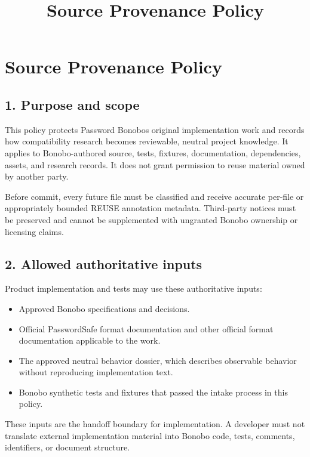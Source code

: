 \documentclass[
  letterpaper,
]{article}
\title{Source Provenance Policy}
\author{}
\date{}
\providecommand{\tightlist}{%
  \setlength{\itemsep}{0pt}\setlength{\parskip}{0pt}}
\begin{document}
\maketitle

{
\setcounter{tocdepth}{3}
\tableofcontents
}
\section{Source Provenance Policy}\label{source-provenance-policy}

\subsection{1. Purpose and scope}\label{1-purpose-and-scope}

This policy protects Password Bonobo\textquotesingle s original implementation work and records how compatibility
research becomes reviewable, neutral project knowledge. It applies to Bonobo-authored source, tests, fixtures,
documentation, dependencies, assets, and research records. It does not grant permission to reuse material owned by
another party.

Before commit, every future file must be classified and receive accurate per-file or appropriately bounded REUSE
annotation metadata. Third-party notices must be preserved and cannot be supplemented with ungranted Bonobo ownership or
licensing claims.

\subsection{2. Allowed authoritative inputs}\label{2-allowed-authoritative-inputs}

Product implementation and tests may use these authoritative inputs:

\begin{itemize}
\tightlist
\item
  Approved Bonobo specifications and decisions.
\item
  Official PasswordSafe format documentation and other official format documentation applicable to the work.
\item
  The approved neutral behavior dossier, which describes observable behavior without reproducing implementation text.
\item
  Bonobo synthetic tests and fixtures that passed the intake process in this policy.
\end{itemize}

These inputs are the handoff boundary for implementation. A developer must not translate external implementation
material into Bonobo code, tests, comments, identifiers, or document structure.
\end{document}
